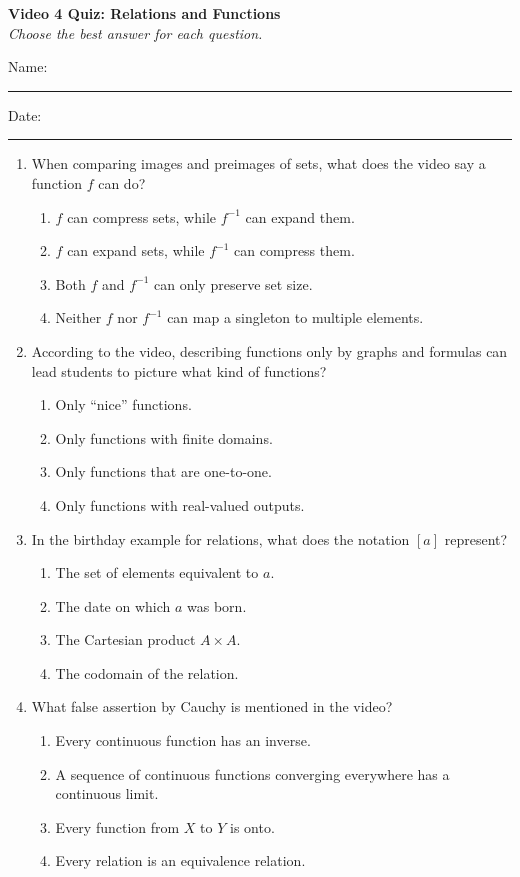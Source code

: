 \documentclass[10pt]{article}
\begin{document}
\begin{center}
  {\large\bfseries Video 4 Quiz: Relations and Functions}\\[0.25em]
  \textit{Choose the best answer for each question.}
\end{center}
\noindent Name:\ \rule{3.2in}{0.4pt}\hfill Date:\ \rule{1.25in}{0.4pt}
\vspace{0.7em}
\begin{enumerate}
  \item When comparing images and preimages of sets, what does the video say a function $f$ can do?
  \begin{enumerate}
    \item $f$ can compress sets, while $f^{-1}$ can expand them.
    \item $f$ can expand sets, while $f^{-1}$ can compress them.
    \item Both $f$ and $f^{-1}$ can only preserve set size.
    \item Neither $f$ nor $f^{-1}$ can map a singleton to multiple elements.
  \end{enumerate}

  \item According to the video, describing functions only by graphs and formulas can lead students to picture what kind of functions?
  \begin{enumerate}
    \item Only ``nice'' functions.
    \item Only functions with finite domains.
    \item Only functions that are one-to-one.
    \item Only functions with real-valued outputs.
  \end{enumerate}

  \item In the birthday example for relations, what does the notation $[a]$ represent?
  \begin{enumerate}
    \item The set of elements equivalent to $a$.
    \item The date on which $a$ was born.
    \item The Cartesian product $A\times A$.
    \item The codomain of the relation.
  \end{enumerate}

  \item What false assertion by Cauchy is mentioned in the video?
  \begin{enumerate}
    \item Every continuous function has an inverse.
    \item A sequence of continuous functions converging everywhere has a continuous limit.
    \item Every function from $X$ to $Y$ is onto.
    \item Every relation is an equivalence relation.
  \end{enumerate}
\end{enumerate}
\end{document}
